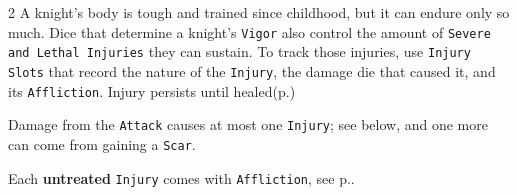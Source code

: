 \begin{multicols*}{2}
A knight's body is tough and trained since childhood, but it can endure only so much.
Dice that determine a knight's \texttt{Vigor} also control the amount of \texttt{Severe and Lethal Injuries} they can sustain.
To track those injuries, use \texttt{Injury Slots} that record the nature of the \texttt{Injury}, the damage die that caused it, and its \texttt{Affliction}.
Injury persists until healed(p.\pageref*{sec:healing})

Damage from the \texttt{Attack} causes at most one \texttt{Injury}; see below, and one more can come from gaining a \texttt{Scar}. 


Each \textbf{untreated} \texttt{Injury} comes with \texttt{Affliction}, see p.\pageref*{sec:affliction}.

\end{multicols*}
